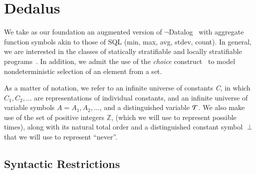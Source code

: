 

\section{Dedalus}
We take as our foundation 
an augmented version of \linebreak
$\lnot$Datalog~\cite{ullmanbook} with aggregate function
symbols akin to those of SQL (min, max, avg, stdev, count).  In general, we are interested in the classes of statically
stratifiable and locally stratifiable programs~\cite{prz}.  In addition, we admit the
use of the \emph{choice} construct~\cite{greedychoice, eventchoice} to model
nondeterministic selection of an element from a set.  

As a matter of notation, we refer to an infinite universe of constants \emph{C}, in which
$C_{1}, C_{2}, \ldots$ are representations of individual constants, and
an infinite universe of variable symbols $A = A_1, A_2, \ldots$, and a distinguished variable $\Tau$.
We also make use of the set of positive integers $\mathbb{Z}$,
(which we will use to represent possible times), along with its natural total order
 and a distinguished constant symbol $\perp$ that we will use to represent ``never''.

\subsection{Syntactic Restrictions}


